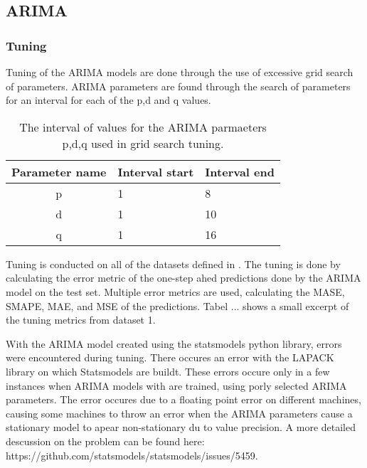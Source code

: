 \subsection{ARIMA}
\label{section:Restuls:ARIMA}


\subsubsection{Tuning}
\label{section:Results:ARIMA:Tuning}
Tuning of the ARIMA models are done through the use of excessive grid search of parameters.
ARIMA parameters are found through the search of parameters for an interval for each of the p,d and q values.

\begin{table}[h]
  \centering
  \caption{The interval of values for the ARIMA parmaeters p,d,q used in grid search tuning.}
  \label{table:results:arima:tuning_parameter_interval}
  \begin{tabular}{|c|l|l|}\hline
    Parameter name & Interval start     & Interval end   \\ \hline
    p   & 1         & 8                 \\ \hline
    d   & 1         & 10                \\ \hline
    q   & 1         & 16                \\ \hline
  \end{tabular}
\end{table}

Tuning is conducted on all of the datasets defined in .
The tuning is done by calculating the error metric of the one-step ahed predictions done by the ARIMA model on the test set.
Multiple error metrics are used, calculating the MASE, SMAPE, MAE, and MSE of the predictions.
Tabel ... shows a small excerpt of the tuning metrics from dataset 1.


With the ARIMA model created using the statsmodels python library, errors were encountered during tuning.
There occures an error with the LAPACK library on which Statsmodels are buildt.
These errors occure only in a few instances when ARIMA models with are trained, using porly selected ARIMA parameters.
The error occures due to a floating point error on different machines, causing some machines to throw an error when the ARIMA parameters cause a stationary model to apear non-stationary du to value precision.
A more detailed descussion on the problem can be found here: https://github.com/statsmodels/statsmodels/issues/5459.

